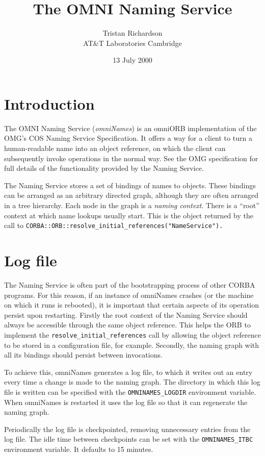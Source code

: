 \documentclass[a4paper,11pt,twoside]{article}
\title{The OMNI Naming Service}
\author{Tristan Richardson\\
AT\&T Laboratories Cambridge
}
\date{13 July 2000}
\begin{document}
\maketitle

\section{Introduction}

The OMNI Naming Service (\emph{omniNames}) is an omniORB
implementation of the OMG's COS Naming Service Specification.  It
offers a way for a client to turn a human-readable name into an object
reference, on which the client can subsequently invoke operations in
the normal way.  See the OMG specification for full details of the
functionality provided by the Naming Service.

The Naming Service stores a set of bindings of names to objects.
These bindings can be arranged as an arbitrary directed graph,
although they are often arranged in a tree hierarchy.  Each node in
the graph is a \emph{naming context}.  There is a ``root'' context at
which name lookups usually start.  This is the object returned by the
call to \verb|CORBA::ORB::resolve_initial_references("NameService").|


\section{Log file}

The Naming Service is often part of the bootstrapping process of other
CORBA programs.  For this reason, if an instance of omniNames crashes
(or the machine on which it runs is rebooted), it is important that
certain aspects of its operation persist upon restarting.  Firstly the
root context of the Naming Service should always be accessible through
the same object reference.  This helps the ORB to implement the
\verb|resolve_initial_references| call by allowing the object
reference to be stored in a configuration file, for example.
Secondly, the naming graph with all its bindings should persist
between invocations.

To achieve this, omniNames generates a log file, to which it writes
out an entry every time a change is made to the naming graph.  The
directory in which this log file is written can be specified with the
\verb|OMNINAMES_LOGDIR| environment variable.  When omniNames is
restarted it uses the log file so that it can regenerate the naming
graph.

Periodically the log file is checkpointed, removing unnecessary
entries from the log file.  The idle time between checkpoints can be
set with the \verb|OMNINAMES_ITBC| environment variable.  It defaults
to 15 minutes.
\end{document}
